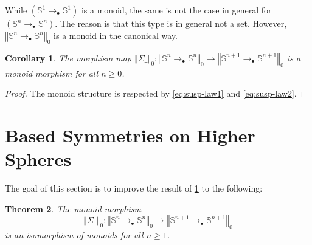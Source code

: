 \documentclass[11pt,a4paper,oneside,reqno]{amsart}
\newtheorem{theorem}{Theorem}
\newtheorem{corollary}[theorem]{Corollary}
\theoremstyle{definition}
\theoremstyle{remark}
\newcommand{\sph}[1]{{\mathbb S}^{#1}}
\newcommand{\trunc}[2]{\mathopen{}\left\Vert #2\right\Vert_{#1}\mathclose{}}
\newcommand{\pointedm}{\rightarrow_\bullet}
\begin{document}
While $(\sph 1 \pointedm \sph 1)$ is a monoid, the same is not the case in general for $(\sph n \pointedm \sph n)$.
The reason is that this type is in general not a set.
However,
$\trunc 0 {\sph n \pointedm \sph n}$ is a monoid in the canonical way.

\begin{corollary} \label{cor:mon-mor}
 The morphism map $\trunc 0 {\Sigma \_} : \trunc 0 {\sph n \pointedm \sph n} \to \trunc 0 {\sph {n+1} \pointedm \sph {n+1}}$ is a monoid morphism for all $n \geq 0$.
\end{corollary}
\begin{proof}
 The monoid structure is respected by \eqref{eq:susp-law1} and \eqref{eq:susp-law2}.
%  
\end{proof}

\section{Based Symmetries on Higher Spheres}

The goal of this section is to improve the result of 
\cref{cor:mon-mor} to the following:

\begin{theorem} \label{thm:mon-iso}
The monoid morphism
\begin{equation}
 \trunc 0 {\Sigma \_} : \trunc 0 {\sph n \pointedm \sph n} \to \trunc 0 {\sph {n+1} \pointedm \sph {n+1}}
\end{equation}
is an isomorphism of monoids for all $n \geq 1$. 
\end{theorem}
\end{document}
